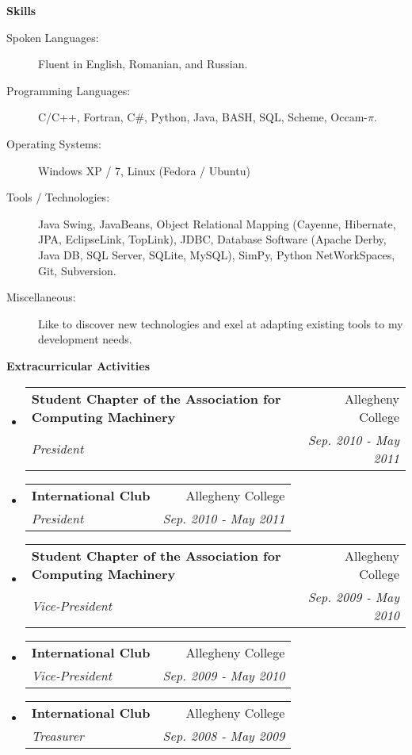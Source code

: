 \documentclass[letterpaper,11pt]{article}
\makeatletter
\newcommand{\resheading}[1]{{\large \colorbox{mygrey}{\begin{minipage}{\textwidth}{\textbf{#1 \vphantom{p\^{E}}}}\end{minipage}}}}
\newcommand{\ressubheading}[4]{
\begin{tabular*}{7.0in}{l@{\extracolsep{\fill}}r}
		\textbf{#1} & #2 \\
		\textit{#3} & \textit{#4} \\
\end{tabular*}\vspace{-6pt}}
\makeatother
\begin{document}
\pagebreak

\resheading{Skills}

\begin{description}
\item[Spoken Languages:]
Fluent in English, Romanian, and Russian.
\item[Programming Languages:]
C/C++, Fortran, C\#, Python, Java, BASH, SQL, Scheme, Occam-$\pi$.
\item[Operating Systems:]
Windows XP / 7, Linux (Fedora / Ubuntu)
\item[Tools / Technologies:]
Java Swing, JavaBeans, Object Relational Mapping (Cayenne, Hibernate, JPA, EclipseLink, TopLink), JDBC, Database Software (Apache Derby, Java DB, SQL Server, SQLite, MySQL), SimPy, Python NetWorkSpaces, Git, Subversion.
\item[Miscellaneous:]
Like to discover new technologies and exel at adapting existing tools to my development needs.
\end{description}

\resheading{Extracurricular Activities}
\begin{itemize}
\item
	\ressubheading{Student Chapter of the Association for Computing Machinery}{Allegheny College}{President}{Sep. 2010 - May 2011}
\item
	\ressubheading{International Club}{Allegheny College}{President}{Sep. 2010 - May 2011}
\item
	\ressubheading{Student Chapter of the Association for Computing Machinery}{Allegheny College}{Vice-President}{Sep. 2009 - May 2010}
\item
	\ressubheading{International Club}{Allegheny College}{Vice-President}{Sep. 2009 - May 2010}
\item
	\ressubheading{International Club}{Allegheny College}{Treasurer}{Sep. 2008 - May 2009}
\end{itemize}
\end{document}

